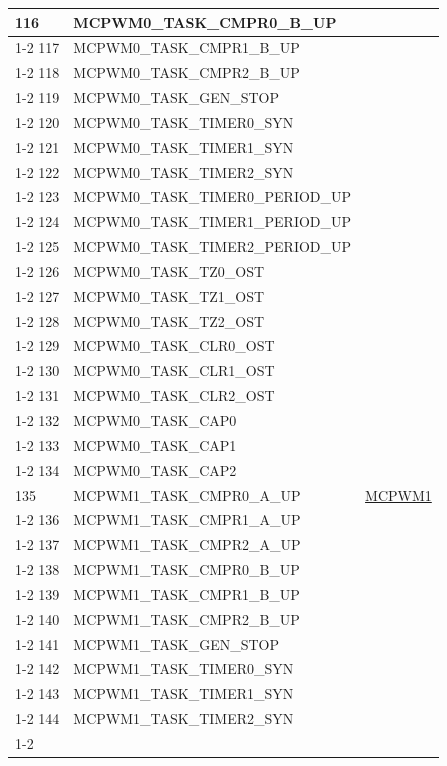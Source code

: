\documentclass[main\_\_EN.tex]{subfiles}
\begin{document}
\begin{longtable}{ | l | l | l | }
116 & MCPWM0\_TASK\_CMPR0\_B\_UP& \\ \cline{1-2}
117 & MCPWM0\_TASK\_CMPR1\_B\_UP& \\ \cline{1-2}
118 & MCPWM0\_TASK\_CMPR2\_B\_UP& \\ \cline{1-2}
119 & MCPWM0\_TASK\_GEN\_STOP & \\ \cline{1-2}
120 & MCPWM0\_TASK\_TIMER0\_SYN & \\ \cline{1-2}
121 & MCPWM0\_TASK\_TIMER1\_SYN & \\ \cline{1-2}
122 & MCPWM0\_TASK\_TIMER2\_SYN & \\ \cline{1-2}
123 & MCPWM0\_TASK\_TIMER0\_PERIOD\_UP      & \\ \cline{1-2}
124 & MCPWM0\_TASK\_TIMER1\_PERIOD\_UP      & \\ \cline{1-2}
125 & MCPWM0\_TASK\_TIMER2\_PERIOD\_UP      & \\ \cline{1-2}
126 & MCPWM0\_TASK\_TZ0\_OST  & \\ \cline{1-2}
127 & MCPWM0\_TASK\_TZ1\_OST  & \\ \cline{1-2}
128 & MCPWM0\_TASK\_TZ2\_OST  & \\ \cline{1-2}
129 & MCPWM0\_TASK\_CLR0\_OST & \\ \cline{1-2}
130 & MCPWM0\_TASK\_CLR1\_OST & \\ \cline{1-2}
131 & MCPWM0\_TASK\_CLR2\_OST & \\ \cline{1-2}
132 & MCPWM0\_TASK\_CAP0      & \\ \cline{1-2}
133 & MCPWM0\_TASK\_CAP1      & \\ \cline{1-2}
134 & MCPWM0\_TASK\_CAP2      & \\ \hline
135 & MCPWM1\_TASK\_CMPR0\_A\_UP& \hyperref[mod:mcpwm]{MCPWM1}\\ \cline{1-2}
136 & MCPWM1\_TASK\_CMPR1\_A\_UP& \\ \cline{1-2}
137 & MCPWM1\_TASK\_CMPR2\_A\_UP& \\ \cline{1-2}
138 & MCPWM1\_TASK\_CMPR0\_B\_UP& \\ \cline{1-2}
139 & MCPWM1\_TASK\_CMPR1\_B\_UP& \\ \cline{1-2}
140 & MCPWM1\_TASK\_CMPR2\_B\_UP& \\ \cline{1-2}
141 & MCPWM1\_TASK\_GEN\_STOP & \\ \cline{1-2}
142 & MCPWM1\_TASK\_TIMER0\_SYN & \\ \cline{1-2}
143 & MCPWM1\_TASK\_TIMER1\_SYN & \\ \cline{1-2}
144 & MCPWM1\_TASK\_TIMER2\_SYN & \\ \cline{1-2}

\end{longtable}
\end{document}
